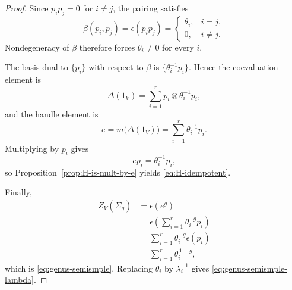 \begin{proof}
Since $p_i p_j = 0$ for $i\neq j$, the pairing satisfies
\begin{equation}\label{eq:idempotent-pairing}
\beta(p_i,p_j)=\epsilon(p_i p_j)=
\begin{cases}
\theta_i, & i=j,\\
0, & i\neq j.
\end{cases}
\end{equation}
Nondegeneracy of $\beta$ therefore forces $\theta_i \neq 0$ for every $i$.

\medskip

\noindent The basis dual to $\{p_i\}$ with respect to $\beta$ is $\{\theta_i^{-1}p_i\}$. Hence the coevaluation element is
\begin{equation}\label{eq:Delta-one-idempotent}
\Delta(1_V)=\sum_{i=1}^r p_i \otimes \theta_i^{-1} p_i,
\end{equation}
and the handle element is
\begin{equation}\label{eq:handle-idempotent}
e=m\bigl(\Delta(1_V)\bigr)=\sum_{i=1}^r \theta_i^{-1} p_i.
\end{equation}
Multiplying by $p_i$ gives
\begin{equation}\label{eq:e-on-pi}
ep_i=\theta_i^{-1} p_i,
\end{equation}
so Proposition~\ref{prop:H-is-mult-by-e} yields \eqref{eq:H-idempotent}.

\medskip

\noindent Finally,
\begin{align}
Z_V(\Sigma_g)
&= \epsilon(e^g) \label{eq:semisimple-first} \\
&= \epsilon\left(\sum_{i=1}^r \theta_i^{-g} p_i\right) \nonumber \\
&= \sum_{i=1}^r \theta_i^{-g}\epsilon(p_i) \nonumber \\
&= \sum_{i=1}^r \theta_i^{\,1-g}, \label{eq:semisimple-last}
\end{align}
which is \eqref{eq:genus-semismple}. Replacing $\theta_i$ by $\lambda_i^{-1}$ gives \eqref{eq:genus-semismple-lambda}.
\end{proof}

